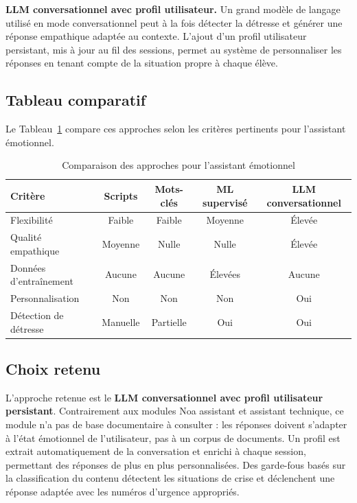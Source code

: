 \textbf{LLM conversationnel avec profil utilisateur.}
Un grand modèle de langage utilisé en mode conversationnel peut à la fois
détecter la détresse et générer une réponse empathique adaptée au contexte.
L'ajout d'un profil utilisateur persistant, mis à jour au fil des sessions,
permet au système de personnaliser les réponses en tenant compte
de la situation propre à chaque élève.

\subsection{Tableau comparatif}

Le Tableau~\ref{tab:comparatif_emotionnel} compare ces approches
selon les critères pertinents pour l'assistant émotionnel.

\vspace{6pt}
\begin{table}[H]
\centering
\caption{Comparaison des approches pour l'assistant émotionnel}
\label{tab:comparatif_emotionnel}
\begin{tabular}{|l|c|c|c|c|}
\hline
\textbf{Critère} & \textbf{Scripts} & \textbf{Mots-clés} & \textbf{ML supervisé} & \textbf{LLM conversationnel} \\
\hline
Flexibilité & Faible & Faible & Moyenne & Élevée \\
Qualité empathique & Moyenne & Nulle & Nulle & Élevée \\
Données d'entraînement & Aucune & Aucune & Élevées & Aucune \\
Personnalisation & Non & Non & Non & Oui \\
Détection de détresse & Manuelle & Partielle & Oui & Oui \\
\hline
\end{tabular}
\end{table}

\subsection{Choix retenu}

L'approche retenue est le \textbf{LLM conversationnel avec profil utilisateur persistant}.
Contrairement aux modules Noa assistant et assistant technique,
ce module n'a pas de base documentaire à consulter :
les réponses doivent s'adapter à l'état émotionnel de l'utilisateur,
pas à un corpus de documents.
Un profil est extrait automatiquement de la conversation et enrichi à chaque session,
permettant des réponses de plus en plus personnalisées.
Des garde-fous basés sur la classification du contenu détectent
les situations de crise et déclenchent une réponse adaptée
avec les numéros d'urgence appropriés.

